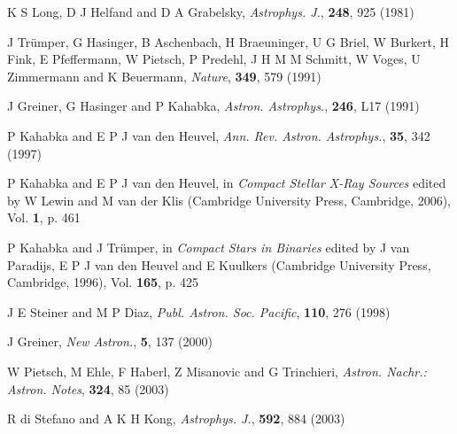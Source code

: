 %

\newcommand{\Nat}{Nature}
\newcommand{\AnA}{Astron. Astrophys.}
\newcommand{\AnASS}{Astron. Astrophys. Suppl. Series}
\newcommand{\ARAA}{Ann. Rev. Astron. Astrophys.}
\newcommand{\ApJ}{Astrophys. J.}
\newcommand{\PASP}{Publ. Astron. Soc. Pacific}
\newcommand{\NA}{New Astron.}
\newcommand{\ANAN}{Astron. Nachr.: Astron. Notes}
\newcommand{\MNRAS}{Mon. Not. R. Astron. Soc.}
\newcommand{\ASR}{Adv. Space Res.}
\newcommand{\RMP}{Rev. Mod. Phys.}
\newcommand{\Pram}{Pramana}
\newcommand{\SAM}{Stellar Atmos. Modeling}
\newcommand{\JCAM}{J. Comput. Appl. Math.}
\newcommand{\AJET}{ADBU J. Eng. Technol.}
\newcommand{\ARX}{arXiv preprint}

\begin{thebibliography}{100}
	K S Long, D J Helfand and D A Grabelsky, \textit{\ApJ}, \textbf{248}, 925 (1981)
	
	J Tr{\"u}mper, G Hasinger, B Aschenbach, H Braeuninger, U G Briel, W Burkert, H Fink, E Pfeffermann, W Pietsch, P Predehl, J H M M Schmitt, W Voges, U Zimmermann and K Beuermann, \textit{\Nat}, \textbf{349}, 579 (1991)
	
	J Greiner, G Hasinger and P Kahabka, \textit{\AnA}, \textbf{246}, L17 (1991)
	
	P Kahabka and E P J van den Heuvel, \textit{\ARAA}, \textbf{35}, 342 (1997)
	
	P Kahabka and E P J van den Heuvel, in \textit{Compact Stellar X-Ray Sources} edited by W Lewin and M van der Klis (Cambridge University Press, Cambridge, 2006), Vol. \textbf{1}, p. 461

	P Kahabka and J Tr{\"u}mper, in \textit{Compact Stars in Binaries} edited by J van Paradijs, E P J van den Heuvel and E Kuulkers (Cambridge University Press, Cambridge, 1996), Vol. \textbf{165}, p. 425

	J E Steiner and M P Diaz, \textit{\PASP}, \textbf{110}, 276 (1998)

	J Greiner, \textit{\NA}, \textbf{5}, 137 (2000)

	W Pietsch, M Ehle, F Haberl, Z Misanovic and G Trinchieri, \textit{\ANAN}, \textbf{324}, 85 (2003)

	R di Stefano and A K H Kong, \textit{\ApJ}, \textbf{592}, 884 (2003)


\end{thebibliography}
